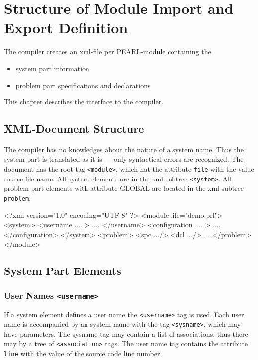 \chapter{Structure of Module Import and Export Definition}

The compiler creates an xml-file per PEARL-module containing the
\begin{itemize}
\item system part information
\item problem part specifications and declarations
\end{itemize}

This chapter describes the interface to the compiler.

\section{XML-Document Structure}
The compiler has no knowledges about the nature of a system name.
Thus the system part is translated as it is --- only syntactical errors
are recognized. 
The document has the root tag \verb|<module>|, which hat the attribute
\verb|file| with the value source file name.  
All system elements are in the xml-subtree \verb|<system>|.
All problem part elements with attribute GLOBAL are located
in the xml-subtree \verb|problem|.

\begin{XMLCode}
<?xml version="1.0" encoding="UTF-8" ?>
<module file="demo.prl">
<system>
   <username .... >
   ....
   </username>
   <configuration .... >
   ....
   </configuration>
</system>
<problem>
  <spc .../>
  <dcl .../>
  ...
</problem>
</module>
\end{XMLCode}

\section{System Part Elements}
\subsection{User Names \texttt{<username>}}
If a system element defines a user name the \verb|<username>| tag is 
used. Each user name is accompanied by an system name with the tag 
\verb|<sysname>|, which may have parameters.
The sysname-tag may contain a list of associations, thus there may by a tree
of \verb|<association>| tags.
The user name tag contains the attribute \verb|line| with the value of the 
source code line number.

